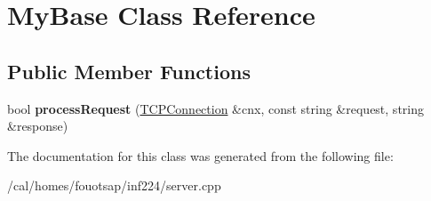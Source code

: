 \hypertarget{class_my_base}{\section{My\+Base Class Reference}
\label{class_my_base}
}
\subsection*{Public Member Functions}
\begin{DoxyCompactItemize}
\item 
\hypertarget{class_my_base_a818864f09718a0aa6d65f5ac5733b689}{bool {\bfseries process\+Request} (\hyperlink{classcppu_1_1_t_c_p_connection}{T\+C\+P\+Connection} \&cnx, const string \&request, string \&response)}\label{class_my_base_a818864f09718a0aa6d65f5ac5733b689}

\end{DoxyCompactItemize}


The documentation for this class was generated from the following file\+:\begin{DoxyCompactItemize}
\item 
/cal/homes/fouotsap/inf224/server.\+cpp\end{DoxyCompactItemize}

